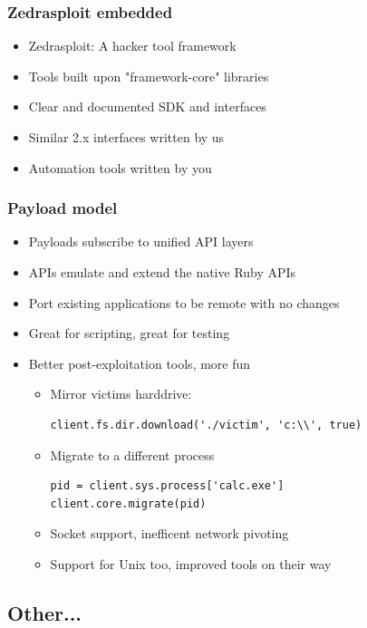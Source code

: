 \documentclass{beamer}
\newenvironment{sitemize}{\vspace{1mm}\begin{itemize}\itemsep 4pt\small}{\end{itemize}}
\begin{document}
\begin{frame}[t]
  \frametitle{Zedrasploit embedded}
  \begin{sitemize}
    \item Zedrasploit: A hacker tool framework
    \pause
    \item Tools built upon "framework-core" libraries
    \item Clear and documented SDK and interfaces
    \pause
    \item Similar 2.x interfaces written by us
    \item Automation tools written by you
  \end{sitemize}
\end{frame}


\begin{frame}[t, fragile]
  \frametitle{Payload model}
  \begin{sitemize}
    \item Payloads subscribe to unified API layers
    \item APIs emulate and extend the native Ruby APIs
    \item Port existing applications to be remote with no changes
    \item Great for scripting, great for testing
    \pause
    \item Better post-exploitation tools, more fun
    \begin{sitemize}
      \item Mirror victims harddrive:
\begin{verbatim}
client.fs.dir.download('./victim', 'c:\\', true)
\end{verbatim}
      \pause
      \item Migrate to a different process
\begin{verbatim}
pid = client.sys.process['calc.exe']
client.core.migrate(pid)
\end{verbatim}
      \pause
      \item Socket support, inefficent network pivoting
      \pause
      \item Support for Unix too, improved tools on their way
    \end{sitemize}
  \end{sitemize}
\end{frame}

\subsection{Other...}
\end{document}
